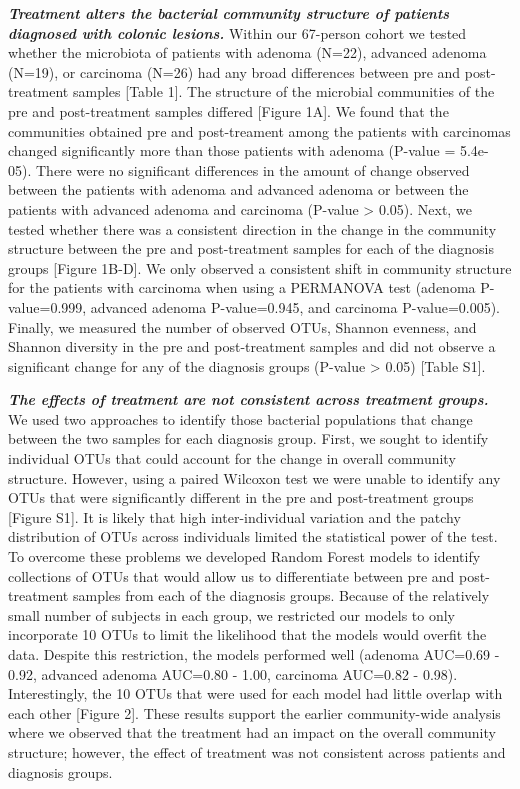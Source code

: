 \documentclass[12pt,]{article}
\begin{document}
\textbf{\emph{Treatment alters the bacterial community structure of
patients diagnosed with colonic lesions.}} Within our 67-person cohort
we tested whether the microbiota of patients with adenoma (N=22),
advanced adenoma (N=19), or carcinoma (N=26) had any broad differences
between pre and post-treatment samples {[}Table 1{]}. The structure of
the microbial communities of the pre and post-treatment samples differed
{[}Figure 1A{]}. We found that the communities obtained pre and
post-treament among the patients with carcinomas changed significantly
more than those patients with adenoma (P-value = 5.4e-05). There were no
significant differences in the amount of change observed between the
patients with adenoma and advanced adenoma or between the patients with
advanced adenoma and carcinoma (P-value \textgreater{} 0.05). Next, we
tested whether there was a consistent direction in the change in the
community structure between the pre and post-treatment samples for each
of the diagnosis groups {[}Figure 1B-D{]}. We only observed a consistent
shift in community structure for the patients with carcinoma when using
a PERMANOVA test (adenoma P-value=0.999, advanced adenoma P-value=0.945,
and carcinoma P-value=0.005). Finally, we measured the number of
observed OTUs, Shannon evenness, and Shannon diversity in the pre and
post-treatment samples and did not observe a significant change for any
of the diagnosis groups (P-value \textgreater{} 0.05) {[}Table S1{]}.

\textbf{\emph{The effects of treatment are not consistent across
treatment groups.}} We used two approaches to identify those bacterial
populations that change between the two samples for each diagnosis
group. First, we sought to identify individual OTUs that could account
for the change in overall community structure. However, using a paired
Wilcoxon test we were unable to identify any OTUs that were
significantly different in the pre and post-treatment groups {[}Figure
S1{]}. It is likely that high inter-individual variation and the patchy
distribution of OTUs across individuals limited the statistical power of
the test. To overcome these problems we developed Random Forest models
to identify collections of OTUs that would allow us to differentiate
between pre and post-treatment samples from each of the diagnosis
groups. Because of the relatively small number of subjects in each
group, we restricted our models to only incorporate 10 OTUs to limit the
likelihood that the models would overfit the data. Despite this
restriction, the models performed well (adenoma AUC=0.69 - 0.92,
advanced adenoma AUC=0.80 - 1.00, carcinoma AUC=0.82 - 0.98).
Interestingly, the 10 OTUs that were used for each model had little
overlap with each other {[}Figure 2{]}. These results support the
earlier community-wide analysis where we observed that the treatment had
an impact on the overall community structure; however, the effect of
treatment was not consistent across patients and diagnosis groups.
\end{document}

